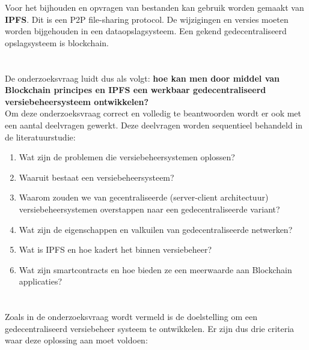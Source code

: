 Voor het bijhouden en opvragen van bestanden kan gebruik worden gemaakt van \textbf{IPFS}. Dit is een P2P file-sharing protocol. De wijzigingen en versies moeten worden bijgehouden in een dataopslagsysteem. Een gekend gedecentraliseerd opslagsysteem is blockchain.


\section{}
\label{sec:onderzoeksvraag}
De onderzoeksvraag luidt dus als volgt: \textbf{hoe kan men door middel van Blockchain principes en IPFS een werkbaar gedecentraliseerd versiebeheersysteem ontwikkelen?}\\

Om deze onderzoeksvraag correct en volledig te beantwoorden wordt er ook met een aantal deelvragen gewerkt. Deze deelvragen worden sequentieel behandeld in de literatuurstudie:

\begin{enumerate}
\item Wat zijn de problemen die versiebeheersystemen oplossen? \\
\item Waaruit bestaat een versiebeheersysteem? \\
\item Waarom zouden we van gecentraliseerde (server-client architectuur) versiebeheersystemen overstappen naar een gedecentraliseerde variant?         \\
\item Wat zijn de eigenschappen en valkuilen van gedecentraliseerde netwerken?\\
\item Wat is IPFS en hoe kadert het binnen versiebeheer?\\
\item Wat zijn smartcontracts en hoe bieden ze een meerwaarde aan Blockchain applicaties?\\
\end{enumerate}


\section{}
\label{sec:onderzoeksdoelstelling}

Zoals in de onderzoeksvraag wordt vermeld is de doelstelling om een gedecentraliseerd versiebeheer systeem te ontwikkelen. Er zijn dus drie criteria waar deze oplossing aan moet voldoen:

